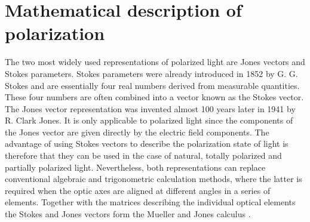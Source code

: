 \section{Mathematical description of polarization}
\label{sec:math_desc}
The two most widely used representations of polarized light are Jones vectors and Stokes parameters. Stokes parameters were already introduced in 1852 by G. G. Stokes and are essentially four real numbers derived from measurable quantities. These four numbers are often combined into a vector known as the Stokes vector. The Jones vector representation was invented almost 100 years later in 1941 by R. Clark Jones. It is only applicable to polarized light since the components of the Jones vector are given directly by the electric field components. The advantage of using Stokes vectors to describe the polarization state of light is therefore that they can be used in the case of natural, totally polarized and partially polarized light. Nevertheless, both representations can replace conventional algebraic and trigonometric calculation methods, where the latter is required when the optic axes are aligned at different angles in a series of elements. Together with the matrices describing the individual optical elements the Stokes and Jones vectors form the Mueller and Jones calculus \cite{Shurcliff1962}. 

